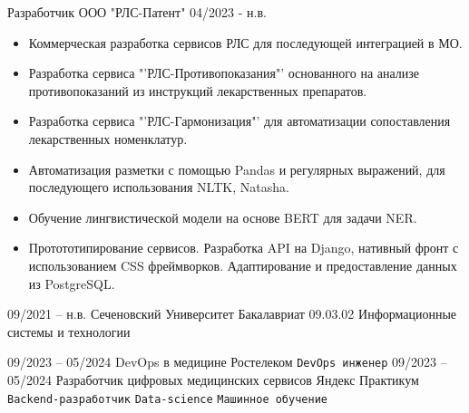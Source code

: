\documentclass[9pt]{developercv}
\begin{document}
\vspace{-10 pt}
\begin{entrylist}
    \entry
		{Разработчик}
		{ООО "РЛС-Патент"}
		{04/2023 - н.в.}
		{
            \begin{itemize}[itemsep=0.5cm, nolistsep, leftmargin=-2cm]
                \item Коммерческая разработка сервисов РЛС для последующей интеграцией в МО.
                \item Разработка сервиса "'РЛС-Противопоказания"' основанного на анализе противопоказаний из инструкций лекарственных препаратов.
                \item Разработка сервиса "'РЛС-Гармонизация"' для автоматизации сопоставления лекарственных номенклатур.
                \item Автоматизация разметки с помощью Pandas и регулярных выражений, для последующего использования NLTK, Natasha.
                \item Обучение лингвистической модели на основе BERT для задачи NER.
                \item Протототипирование сервисов. Разработка API на Django, нативный фронт с использованием CSS фреймворков. Адаптирование и предоставление данных из PostgreSQL. 
            \end{itemize}
            }
\end{entrylist}

\vspace{-15 pt}
\begin{entrylist}
    \entry
		{09/2021 -- н.в.}
		{Сеченовский Университет}
		{Бакалавриат}
		{09.03.02 Информационные системы и технологии}
\end{entrylist}

\vspace{-10 pt}
\begin{entrylist}
	\entry
        {09/2023 -- 05/2024}
		{DevOps в медицине}
		{Ростелеком}
		{\vspace{-10pt} 
        \texttt{DevOps инженер}}
	\entry
		{09/2023 -- 05/2024}
		{Разработчик цифровых медицинских сервисов}
		{Яндекс Практикум}
		{\vspace{-10pt}
        \texttt{Backend-разработчик} \slashsep \texttt{Data-science} \slashsep \texttt{Машинное обучение}}
\end{entrylist}
\end{document}
